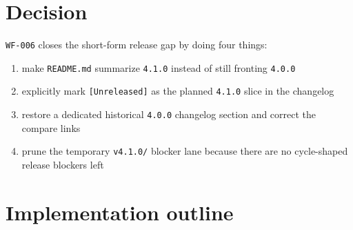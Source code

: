 \section{Decision}\label{record-204-decision}

\texttt{W\allowbreak{}F\allowbreak{}-\allowbreak{}0\allowbreak{}0\allowbreak{}6} closes the short-form release gap by doing four things:

\begin{enumerate}
\def\labelenumi{\arabic{enumi}.}
\tightlist
\item
  make \texttt{R\allowbreak{}E\allowbreak{}A\allowbreak{}D\allowbreak{}M\allowbreak{}E\allowbreak{}.\allowbreak{}m\allowbreak{}d} summarize \texttt{4\allowbreak{}.\allowbreak{}1\allowbreak{}.\allowbreak{}0} instead of still fronting \texttt{4\allowbreak{}.\allowbreak{}0\allowbreak{}.\allowbreak{}0}
\item
  explicitly mark \texttt{[\allowbreak{}U\allowbreak{}n\allowbreak{}r\allowbreak{}e\allowbreak{}l\allowbreak{}e\allowbreak{}a\allowbreak{}s\allowbreak{}e\allowbreak{}d\allowbreak{}]} as the planned \texttt{4\allowbreak{}.\allowbreak{}1\allowbreak{}.\allowbreak{}0} slice in the changelog
\item
  restore a dedicated historical \texttt{4\allowbreak{}.\allowbreak{}0\allowbreak{}.\allowbreak{}0} changelog section and correct the compare links
\item
  prune the temporary \texttt{v\allowbreak{}4\allowbreak{}.\allowbreak{}1\allowbreak{}.\allowbreak{}0\allowbreak{}/} blocker lane because there are no cycle-shaped release blockers left
\end{enumerate}

\section{Implementation outline}\label{record-204-implementation-outline}


